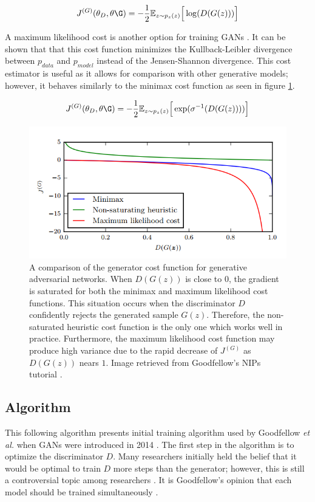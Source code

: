 \documentclass[11pt]{article}
\begin{document}
$$J^{(G)}(\theta_D,\theta\G) = -\frac{1}{2}\mathbb{E}_{z\sim p_{z}(z)}\Big[\log(D(G(z)))\Big]$$

A maximum likelihood cost is another option for training GANs \citep{2017arXiv170100160G}. It can be shown that that this cost function minimizes the Kullback-Leibler divergence between $p_{data}$ and $p_{model}$ instead of the Jensen-Shannon divergence. This cost estimator is useful as it allows for comparison with other generative models; however, it behaves similarly to the minimax cost function as seen in figure \ref{fig:CostFunc}.

$$J^{(G)}(\theta_D,\theta\G) = -\frac{1}{2}\mathbb{E}_{z\sim p_{z}(z)}\Big[\exp(\sigma^{-1}(D(G(z))))\Big]$$

\begin{figure}
\centering
\includegraphics[scale=0.5]{costfunc}
\caption{A comparison of the generator cost function for generative adversarial networks. When $D(G(z))$ is close to $0$, the gradient is saturated for both the minimax and maximum likelihood cost functions. This situation occurs when the discriminator $D$ confidently rejects the generated sample $G(z)$. Therefore, the non-saturated heuristic cost function is the only one which works well in practice. Furthermore, the maximum likelihood cost function may produce high variance due to the rapid decrease of $J^{(G)}$ as $D(G(z))$ nears $1$. Image retrieved from Goodfellow's NIPs tutorial \citep{2017arXiv170100160G}.}
\label{fig:CostFunc}
\end{figure}

\subsection{Algorithm}
This following algorithm presents initial training algorithm used by Goodfellow \textit{et al.} when GANs were introduced in 2014 \citep{2014arXiv1406.2661G}. The first step in the algorithm is to optimize the discriminator $D$. Many researchers initially held the belief that it would be optimal to train $D$ more steps than the generator; however, this is still a controversial topic among researchers \citep{2017arXiv170100160G}. It is Goodfellow's opinion that each model should be trained simultaneously \citep{2017arXiv170100160G}.
\end{document}
